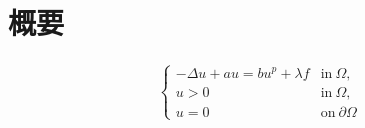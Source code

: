 \section{概要}

\begin{align}
 \left\{
  \begin{array}{ll}
   -\Delta u + a u = b u^p + \lambda f  & \mbox{in}~ \Omega,  \\
   u > 0 & \mbox{in}~ \Omega, \\
   u = 0 & \mbox{on}~ \partial\Omega
  \end{array} 
 \right. \tag*{$(\star)_\lambda$} \label{eq:prob}
\end{align}